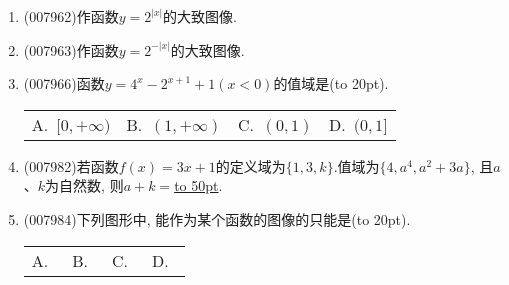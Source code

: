 \documentclass[10pt,a4paper]{article}
\newcommand{\blank}[1]{\underline{\hbox to #1pt{}}}
\newcommand{\bracket}[1]{(\hbox to #1pt{})}
\newcommand{\fourch}[4]{\par\begin{tabular}{p{.23\textwidth}p{.23\textwidth}p{.23\textwidth}p{.23\textwidth}}
A.~#1 &B.~#2& C.~#3& D.~#4
\end{tabular}}
\begin{document}
\begin{enumerate}[1.]
\item {\tiny (007962)}作函数$y=2^{|x|}$的大致图像.
\item {\tiny (007963)}作函数$y=2^{-|x|}$的大致图像.
\item {\tiny (007966)}函数$y=4^x-2^{x+1}+1(x<0)$的值域是\bracket{20}.
\fourch{$[0,+\infty)$}{$(1,+\infty)$}{$(0,1)$}{$(0,1]$}
\item {\tiny (007982)}若函数$f(x)=3x+1$的定义域为$\{1,3,k\}$.值域为$\{4,a^4,a^2+3a\}$, 且$a$、$k$为自然数, 则$a+k=$\blank{50}.
\item {\tiny (007984)}下列图形中, 能作为某个函数的图像的只能是\bracket{20}.
\fourch{\begin{tikzpicture}[>=latex]
    \draw [->] (-1.5,0) -- (1.5,0) node [below] {$x$};
    \draw [->] (0,-1.5) -- (0,1.5) node [left] {$y$};
    \draw (0,0) node [below left] {$O$};
    \draw (1,0) node [below right] {$1$} (-1,0) node [below left] {$-1$} (0,1) node [above left] {$1$} (0,-1) node [below left] {$-1$};
    \draw (0,0) circle (1);
\end{tikzpicture}
}{\begin{tikzpicture}[>=latex]
    \draw [->] (-1.5,0) -- (1.5,0) node [below] {$x$};
    \draw [->] (0,-1.5) -- (0,1.5) node [left] {$y$};
    \draw (0,0) node [below left] {$O$};
    \draw (1,0) node [below right] {$1$} (0,1) node [above left] {$1$} (0,-1) node [below left] {$-1$};
    \draw (0,1) arc (90:-90:1);
\end{tikzpicture}}{\begin{tikzpicture}[>=latex]
    \draw [->] (-1.5,0) -- (1.5,0) node [below] {$x$};
    \draw [->] (0,-1.5) -- (0,1.5) node [left] {$y$};
    \draw (0,0) node [below left] {$O$};
    \draw (1,0) node [below right] {$1$} (0,1) node [above left] {$1$} (0,-1) node [below left] {$-1$} (-1,0) node [below left] {$-1$};
    \draw (0,1) arc (90:0:1) (0,-1) arc (270:180:1);
    \filldraw [fill = white, draw = black] (0,1) circle (0.05) (0,-1) circle (0.05);
\end{tikzpicture}}{\begin{tikzpicture}[>=latex]
    \draw [->] (-1.5,0) -- (1.5,0) node [below] {$x$};
    \draw [->] (0,-1.5) -- (0,1.5) node [left] {$y$};
    \draw (0,0) node [below left] {$O$};
    \draw (1,0) node [below right] {$1$} (0,1) node [above left] {$1$} (0,-1) node [below left] {$-1$} (-1,0) node [below left] {$-1$};
    \draw (0,1) arc (90:180:1) (0,-1) arc (270:360:1);
    \filldraw (0,1) circle (0.05) (0,-1) circle (0.05) (1,0) circle (0.05) (-1,0) circle (0.05);
\end{tikzpicture}}

\end{enumerate}
\end{document}
